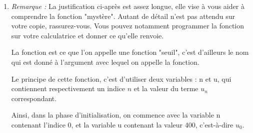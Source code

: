 \begin{enumerate}
\begin{enumerate}
			\begin{itemize}
				\item $\forall n \in \N, \quad u_n \leqslant u_{n+1}$. \quad Autrement dit : la suite est croissante.
				\item $\forall n \in \N, \quad 0\leqslant u_n \leqslant 600$. \quad Autrement dit : la suite est bornée par 0 et 600.
			\end{itemize}

			La suite $(u_n)$ est donc croissante et majorée par 600, et donc, d'après le théorème de convergence monotone, elle est convergente, vers une limite $\ell$, qui vérifie ici : $0 \leqslant \ell \leqslant 600$.
			\item Posons $f$, la fonction définie sur $\R$ par $f(x) = 0,9x + 60$.

			La suite $(u_n)$ est donc définie par récurrence, et la fonction de récurrence est la fonction $f$, définie ci-dessus. Or, la suite est convergente (d'après la question précédente) et la fonction est continue sur $\R$ (c'est une fonction affine). En vertu du théorème du point fixe, la limite $\ell$ de la suite est une des solutions à l'équation $f(x) = x$.

			Comme $f$ est une fonction affine, de coefficient directeur $0,9 \neq 1$, les droites d'équations $y = f(x)$ et $y=x$ sont donc sécantes, en un seul point, donc l'équation n'a qu'une seule solution, et on a déjà identifié une solution évidente : $f(600) = 600$, donc 600 est la seule solution de l'équation. Donc $\ell = 600$.

			La suite $(u_n)$ converge vers 600.
		\end{enumerate}
	\item \emph{Remarque : }La justification ci-après est assez longue, elle vise à vous aider à comprendre la fonction "mystère". Autant de détail n'est pas attendu sur votre copie, rassurez-vous. Vous pouvez notamment programmer la fonction sur votre calculatrice et donner ce qu'elle renvoie.

\medskip

La fonction est ce que l'on appelle une fonction "seuil", c'est d'ailleurs le nom qui est donné à l'argument avec lequel on appelle la fonction.

Le principe de cette fonction, c'est d'utiliser deux variables : n et u, qui contiennent respectivement un indice $n$ et la valeur du terme $u_n$ correspondant.

Ainsi, dans la phase d'initialisation, on commence avec la variable n contenant l'indice 0, et la variable u contenant la valeur 400, c'est-à-dire $u_0$.


\end{enumerate}
